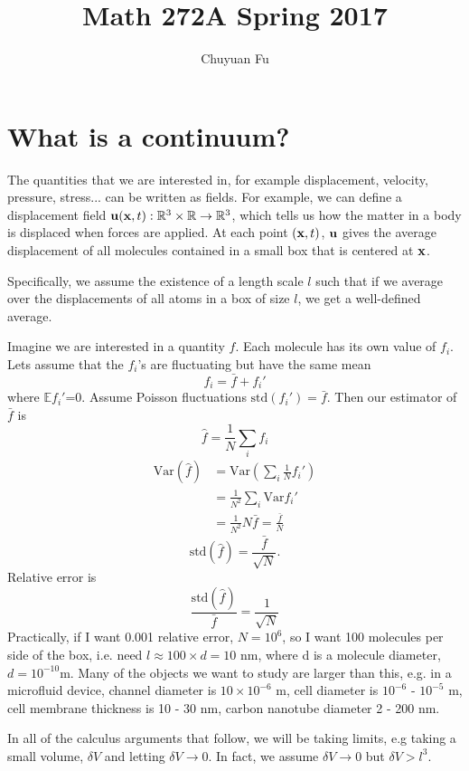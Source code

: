 \documentclass[12pt]{article}
\newcommand{\xx}{{\bf x}}
\newcommand{\uu}{{\bf u}}
\newcommand{\RR}{{\mathbb R}}
\newcommand{\EE}{{\mathbb E}}
\newcommand{\Var}{\text{Var}}
\newcommand{\std}{\text{std}}
\begin{document}
\title{Math 272A Spring 2017}
\author{Chuyuan Fu}
\date{}

\maketitle
\section{What is a continuum?}
The quantities that we are interested in, for example displacement, velocity, pressure, stress... can be written as fields.
For example, we can define a displacement field $\uu(\xx, t) : \RR^3\times \RR \rightarrow \RR^3$, which tells us how the matter in a body is displaced when forces are applied. At each point $(\xx,t)$, $\uu$ gives the average displacement of all molecules contained in a small box that is centered at $\xx$.

Specifically, we assume the existence of a length scale $l$ such that if we average over the displacements of all atoms in a box of size $l$, we get a well-defined average.

Imagine we are interested in a quantity $f$. Each molecule has its own value of $f_i$. Lets assume that the $f_i$'s are fluctuating but have the same mean
\[
f_i = \bar f + f_i'
\]
where $\EE f_i'$=0.
Assume Poisson fluctuations $\std(f_i') = \bar f$.
Then our estimator of $\bar f $ is 
\[
\hat f  = \frac 1 N \sum_i f_i
\]
\begin{align*}
\Var (\hat f)  &=  \Var(\sum_i  \frac 1 N f_i' )\\
		&= \frac {1}{ N^2} \sum_i \Var f_i' \\
		&= \frac {1}{ N^2} N \bar f =\frac{\bar f}{N}
\end{align*}
\[
\std(\hat f ) = \frac{\bar f }{\sqrt{N}}.
\]
Relative error is
\[ 
\frac{\std(\hat f )}{\bar f} = \frac{1}{\sqrt N}
\]
Practically, if I want 0.001 relative error, $N = 10^6$, so I want 100 molecules per side of the box, i.e. need $l \approx 100\times d  = 10$ nm, where d is a molecule diameter, $d = 10^{-10}$m. 
Many of the objects we want to study are larger than this, e.g. in a microfluid device, channel diameter is $10\times 10^{-6} $ m, cell diameter is $10^{-6}$ - $10^{-5}$ m, cell membrane thickness is 10 - 30 nm, carbon nanotube diameter 2 - 200 nm.

In all of the calculus arguments that follow, we will be taking limits, e.g taking a small volume, $\delta V$ and letting $\delta V \rightarrow 0$. In fact, we assume  $\delta V \rightarrow 0$ but $\delta V > l^3$.
\end{document}
